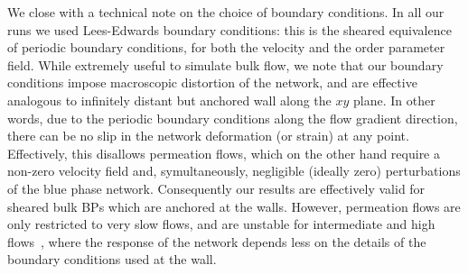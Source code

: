 \documentclass[aps,pre,reprint,superscriptaddress, twocolumn]{revtex4}
\begin{document}
We close with a technical note on the choice of boundary conditions. 
In all our runs we used Lees-Edwards boundary conditions: this
is the sheared equivalence of periodic boundary conditions, for both the 
velocity and the order parameter field. 
While extremely useful to simulate bulk flow, we
note that our boundary conditions impose macroscopic distortion
of the network, and are effective analogous to infinitely distant
but anchored wall along the $xy$ plane. In other words, due to
the periodic boundary conditions along the flow gradient direction, 
there can be no slip in the network deformation (or strain) at any point. 
Effectively, this disallows permeation flows, which on the other
hand require a non-zero velocity field and, symultaneously,
negligible (ideally zero) perturbations of the blue phase network.
Consequently our results are effectively valid for sheared bulk 
BPs which are anchored at the walls. However, permeation flows are 
only restricted to very slow flows, and are unstable for intermediate 
and high flows~\cite{Dupuis:2005}, 
where the response of the network depends less on
the details of the boundary conditions used at the wall.
\newpage



\end{document}
